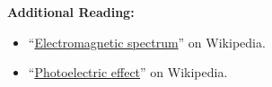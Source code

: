 
{\bf Additional Reading:}
\begin{itemize}
\item ``\href{https://en.wikipedia.org/wiki/Electromagnetic_spectrum}{Electromagnetic spectrum}'' on Wikipedia.
\item ``\href{https://en.wikipedia.org/wiki/Photoelectric_effect}{Photoelectric effect}'' on Wikipedia.
\end{itemize}

